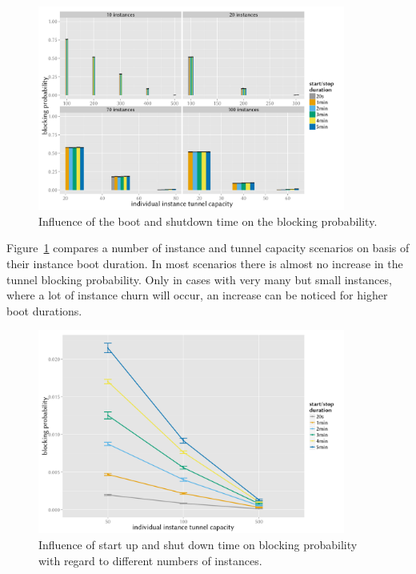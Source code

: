 \begin{figure}[htb]
	\centering
	\includegraphics[width=0.9\textwidth]{images/R-virtualized-startstop-blocking-barchart.pdf}
	\caption{Influence of the boot and shutdown time on the blocking probability.}
\label{c4:fig:blockprob-startstop-barchart}
\end{figure}

Figure~\ref{c4:fig:blockprob-startstop-barchart} compares a number of instance and tunnel capacity scenarios on basis of their instance boot duration. In most scenarios there is almost no increase in the tunnel blocking probability. Only in cases with very many but small instances, where a lot of instance churn will occur, an increase can be noticed for higher boot durations.

\begin{figure}[htbp]
	\centering
	\includegraphics[width=0.9\textwidth]{images/compare-maxinstances-block.pdf}
	\caption{Influence of start up and shut down time on blocking probability with regard to different numbers of instances.}
\label{c4:fig:compare_maxinstances_block}
\end{figure}

